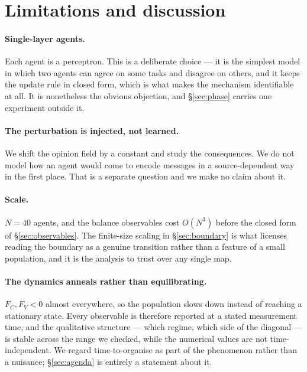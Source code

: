 \section{Limitations and discussion}
\label{sec:limitations}

\paragraph{Single-layer agents.} Each agent is a perceptron. This is a deliberate
choice --- it is the simplest model in which two agents can agree on some tasks and
disagree on others, and it keeps the update rule in closed form, which is what
makes the mechanism identifiable at all. It is nonetheless the obvious objection,
and \S\ref{sec:phase} carries one experiment outside it.

\paragraph{The perturbation is injected, not learned.} We shift the opinion field
by a constant and study the consequences. We do not model how an agent would come
to encode messages in a source-dependent way in the first place. That is a
separate question and we make no claim about it.

\paragraph{Scale.} $N = 40$ agents, and the balance observables cost $O(N^3)$
before the closed form of \S\ref{sec:observables}. The finite-size scaling in
\S\ref{sec:boundary} is what licenses reading the boundary as a genuine transition
rather than a feature of a small population, and it is the analysis to trust over
any single map.

\paragraph{The dynamics anneals rather than equilibrating.} $F_C, F_V < 0$ almost
everywhere, so the population slows down instead of reaching a stationary state.
Every observable is therefore reported at a stated measurement time, and the
qualitative structure --- which regime, which side of the diagonal --- is stable
across the range we checked, while the numerical values are not
time-independent. We regard time-to-organise as part of the phenomenon rather
than a nuisance; \S\ref{sec:agenda} is entirely a statement about it.

